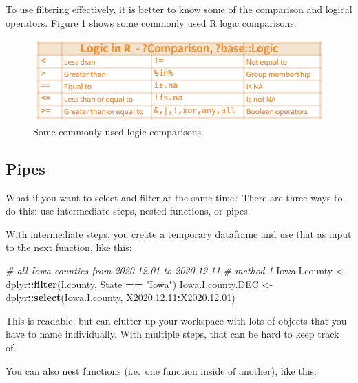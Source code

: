 \documentclass[]{book}
\newenvironment{Shaded}{\begin{snugshade}}{\end{snugshade}}
\newcommand{\KeywordTok}[1]{\textcolor[rgb]{0.13,0.29,0.53}{\textbf{#1}}}
\newcommand{\FloatTok}[1]{\textcolor[rgb]{0.00,0.00,0.81}{#1}}
\newcommand{\StringTok}[1]{\textcolor[rgb]{0.31,0.60,0.02}{#1}}
\newcommand{\CommentTok}[1]{\textcolor[rgb]{0.56,0.35,0.01}{\textit{#1}}}
\newcommand{\OperatorTok}[1]{\textcolor[rgb]{0.81,0.36,0.00}{\textbf{#1}}}
\newcommand{\NormalTok}[1]{#1}
\begin{document}
To use filtering effectively, it is better to know some of the
comparison and logical operators. Figure \ref{fig:logic} shows some
commonly used R logic comparisons:

\begin{figure}

{\centering \includegraphics[width=0.75\linewidth]{figures/logic} 

}

\caption{Some commonly used logic comparisons.}\label{fig:logic}
\end{figure}

\subsection{Pipes}\label{pipes}

What if you want to select and filter at the same time? There are three
ways to do this: use intermediate steps, nested functions, or pipes.

With intermediate steps, you create a temporary dataframe and use that
as input to the next function, like this:

\begin{Shaded}
\begin{Highlighting}[]
\CommentTok{# all Iowa counties from 2020.12.01 to 2020.12.11}
\CommentTok{# method 1}
\NormalTok{Iowa.I.county <-}\StringTok{ }\NormalTok{dplyr}\OperatorTok{::}\KeywordTok{filter}\NormalTok{(I.county, State }\OperatorTok{==}\StringTok{ "Iowa"}\NormalTok{)}
\NormalTok{Iowa.I.county.DEC <-}\StringTok{ }\NormalTok{dplyr}\OperatorTok{::}\KeywordTok{select}\NormalTok{(Iowa.I.county, }
\NormalTok{                                   X2020.}\FloatTok{12.11}\OperatorTok{:}\NormalTok{X2020.}\FloatTok{12.01}\NormalTok{)}
\end{Highlighting}
\end{Shaded}

This is readable, but can clutter up your workspace with lots of objects
that you have to name individually. With multiple steps, that can be
hard to keep track of.

You can also nest functions (i.e.~one function inside of another), like
this:
\end{document}

